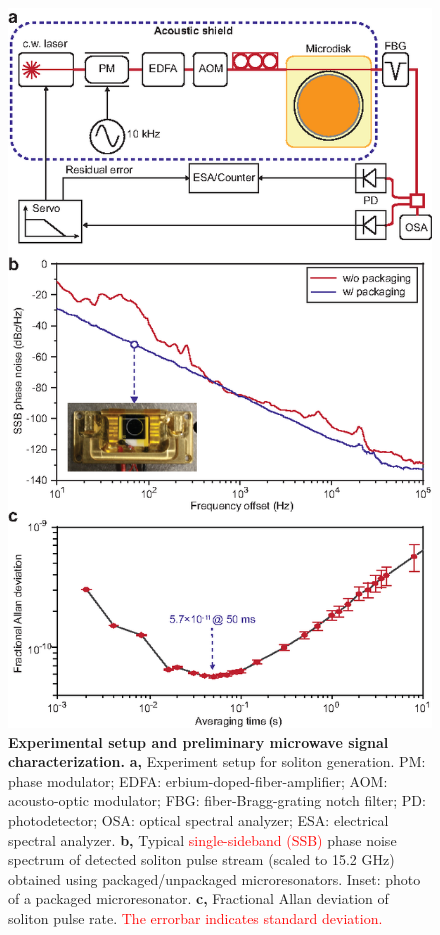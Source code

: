 \documentclass[noshowpacs,amsmath,
twocolumn,
superscriptaddress,
8pt,
aps,prb]{revtex4-2}
\begin{document}
\begin{figure}[!ht]
\centering
\includegraphics[width=\linewidth]{Fig2.eps}
\caption{{\bf Experimental setup and preliminary microwave signal characterization.} {\bf a,} Experiment setup for soliton generation. PM: phase modulator; EDFA: erbium-doped-fiber-amplifier; AOM: acousto-optic modulator; FBG: fiber-Bragg-grating notch filter; PD: photodetector; OSA: optical spectral analyzer; ESA: electrical spectral analyzer. {\bf b,} Typical \textcolor{red}{single-sideband (SSB)} phase noise spectrum of detected soliton pulse stream (scaled to 15.2 GHz) obtained using packaged/unpackaged microresonators. Inset: photo of a packaged microresonator. {\bf c,} Fractional Allan deviation of soliton pulse rate. \textcolor{red}{The errorbar indicates standard deviation. }}
\label{figure2}
\end{figure}
\end{document}
